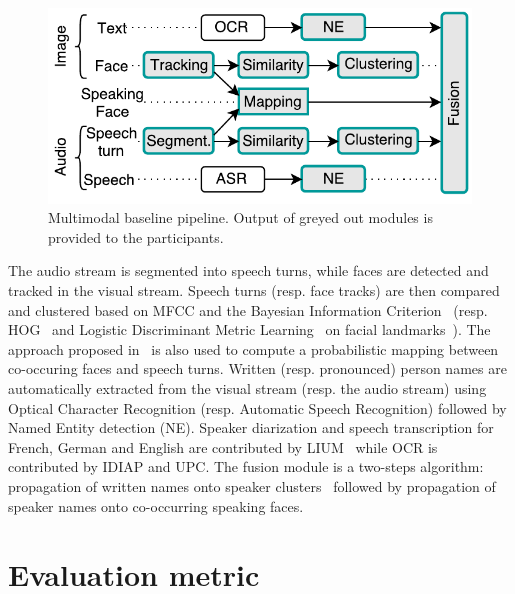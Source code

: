 \documentclass{acm_proc_article-me}
\begin{document}
\begin{figure}[htb]
 \centering
 \includegraphics[width=0.95\linewidth]{figs/baseline.pdf}
 \vspace{-0.6cm}
 \caption{Multimodal baseline pipeline. Output of greyed out modules is provided to the participants.}
 \label{fig:baseline}
\end{figure}

The audio stream is segmented into speech turns, while faces are detected and tracked in the visual stream.
Speech turns (resp. face tracks) are then compared and clustered based on MFCC and the Bayesian Information Criterion~\cite{CHEN--DARPA--1998} (resp. HOG~\cite{DALAL--CVPR--2005} and Logistic Discriminant Metric Learning~\cite{GUILLAUMIN--JCV--2012} on facial landmarks~\cite{URICAR--VISAPP--2012}). The approach proposed in~\cite{POIGNANT--MTAP--2015} is also used to compute a probabilistic mapping between co-occuring faces and speech turns. Written (resp. pronounced) person names are automatically extracted from the visual stream (resp. the audio stream) using Optical Character Recognition (resp. Automatic Speech Recognition) followed by Named Entity detection (NE). Speaker diarization and speech transcription for French, German and English are contributed by LIUM~\cite{ROUVIER--INTERSPEECH--2013, GUPTA--ASRU--2015} while OCR is contributed by IDIAP and UPC. The fusion module is a two-steps algorithm: propagation of written names onto speaker clusters~\cite{POIGNANT--INTERSPEECH--2012} followed by propagation of speaker names onto co-occurring speaking faces.

\vspace{-0.1cm}
\section{Evaluation metric}
\label{sec:metric}
\end{document}

